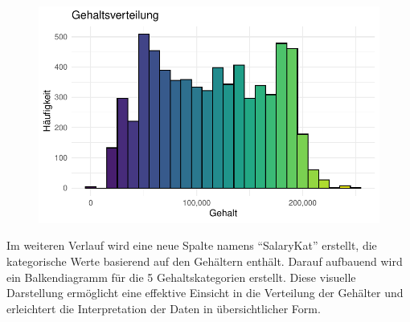 \documentclass[
  letterpaper,
  DIV=11,
  numbers=noendperiod]{scrartcl}
\newenvironment{Shaded}{\begin{snugshade}}{\end{snugshade}}
\newcommand{\AttributeTok}[1]{\textcolor[rgb]{0.40,0.45,0.13}{#1}}
\newcommand{\ConstantTok}[1]{\textcolor[rgb]{0.56,0.35,0.01}{#1}}
\newcommand{\DecValTok}[1]{\textcolor[rgb]{0.68,0.00,0.00}{#1}}
\newcommand{\FunctionTok}[1]{\textcolor[rgb]{0.28,0.35,0.67}{#1}}
\newcommand{\NormalTok}[1]{\textcolor[rgb]{0.00,0.23,0.31}{#1}}
\newcommand{\OtherTok}[1]{\textcolor[rgb]{0.00,0.23,0.31}{#1}}
\newcommand{\SpecialCharTok}[1]{\textcolor[rgb]{0.37,0.37,0.37}{#1}}
\newcommand{\StringTok}[1]{\textcolor[rgb]{0.13,0.47,0.30}{#1}}
\begin{document}
\begin{figure}[H]

{\centering \includegraphics{main_doc_files/figure-pdf/unnamed-chunk-18-1.pdf}

}

\end{figure}

Im weiteren Verlauf wird eine neue Spalte namens ``SalaryKat'' erstellt,
die kategorische Werte basierend auf den Gehältern enthält. Darauf
aufbauend wird ein Balkendiagramm für die 5 Gehaltskategorien erstellt.
Diese visuelle Darstellung ermöglicht eine effektive Einsicht in die
Verteilung der Gehälter und erleichtert die Interpretation der Daten in
übersichtlicher Form.

\begin{Shaded}
\end{Shaded}
\end{document}
